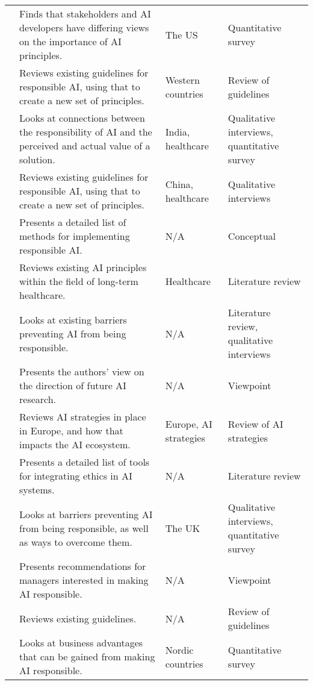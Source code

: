 \begin{table}[!ht]
\begin{tabular}{lp{}lp{}}
        \textcite{Jakesch_2022} & Finds that stakeholders and AI developers have differing views on the importance of AI principles. & The US & Quantitative survey \\ 
        \textcite{Jobin_2019} & Reviews existing guidelines for responsible AI, using that to create a new set of principles. & Western countries & Review of guidelines \\ 
        \textcite{Kumar_2021} & Looks at connections between the responsibility of AI and the perceived and actual value of a solution. & India, healthcare & Qualitative interviews, quantitative survey \\ 
        \textcite{Liu_2021} & Reviews existing guidelines for responsible AI, using that to create a new set of principles. & China, healthcare & Qualitative interviews \\ 
        \textcite{Lu_2022} & Presents a detailed list of methods for implementing responsible AI. & N/A & Conceptual \\ 
        \textcite{Lukkien_2021} & Reviews existing AI principles within the field of long-term healthcare. & Healthcare & Literature review \\ 
        \textcite{Merhi_2022} & Looks at existing barriers preventing AI from being responsible. & N/A & Literature review, qualitative interviews \\ 
        \textcite{Mikalef_2022} & Presents the authors' view on the direction of future AI research. & N/A & Viewpoint \\ 
        \textcite{Minkkinen_2021} & Reviews AI strategies in place in Europe, and how that impacts the AI ecosystem. & Europe, AI strategies & Review of AI strategies \\ 
        \textcite{Morley_2020} & Presents a detailed list of tools for integrating ethics in AI systems. & N/A & Literature review \\ 
        \textcite{Morley_2021} & Looks at barriers preventing AI from being responsible, as well as ways to overcome them. & The UK & Qualitative interviews, quantitative survey \\ 
        \textcite{Nauck_2019} & Presents recommendations for managers interested in making AI responsible. & N/A & Viewpoint \\ 
        \textcite{Nevanpera_2021} & Reviews existing guidelines. & N/A & Review of guidelines \\ 
        \textcite{Papagiannidis_2022} & Looks at business advantages that can be gained from making AI responsible. & Nordic countries & Quantitative survey \\ 

\end{tabular}
\end{table}
